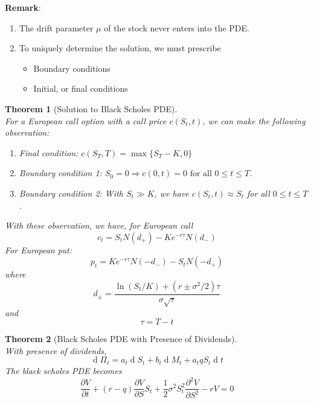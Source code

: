 \documentclass[12pt]{article}
\newtheorem{theorem}{Theorem}[section]
\theoremstyle{definition}
\DeclareMathOperator{\diff}{d}
\begin{document}
\textbf{Remark}:
\begin{enumerate}
  \item The drift parameter $\mu$ of the stock never enters into the PDE.
  \item To uniquely determine the solution, we must prescribe
  \begin{itemize}
    \item Boundary conditions
    \item Initial, or final conditions
  \end{itemize}
\end{enumerate}
\begin{theorem}[Solution to Black Scholes PDE]
\hfill\\\normalfont For a European call option with a call price $c(S_t,t)$, we can make the following observation:
\begin{enumerate}
  \item Final condition: $c(S_T,T)=\max\{S_T-K, 0\}$
  \item Boundary condition 1: $S_0=0\Rightarrow c(0,t)=0\text{ for all }0\leq t\leq T$.
  \item Boundary condition 2: With $S_t\gg K$, we have $c(S_t,t)\approx S_t$ for all $0\leq t\leq T$.
\end{enumerate}
With these observation, we have, for European call
\[
c_t= S_tN(d_{+})-Ke^{-r\tau}N(d_{-})
\]
For European put:
\[
p_t=Ke^{-r\tau}N(-d_{-})-S_tN(-d_+)
\]
where 
\[
d_{\pm}=\frac{\ln(S_t/K)+(r\pm \sigma^2/2)\tau}{\sigma\sqrt{\tau}}
\]
and
\[
\tau = T-t
\]
\end{theorem}
\begin{theorem}[Black Scholes PDE with Presence of Dividends]
\hfill\\\normalfont With presence of dividends,
\[
\diff \Pi_t = a_t\diff S_t+b_t\diff M_t+a_tqS_t\diff t
\] 
The black scholes PDE becomes
\[
\frac{\partial V}{\partial t}+(r-q)\frac{\partial V}{\partial S}S_t +\frac{1}{2}\sigma^2S_t^2\frac{\partial^2 V}{\partial S^2}-rV=0
\]
\end{theorem}
\end{document}
